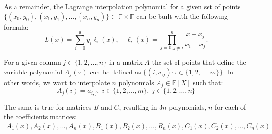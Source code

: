 \documentclass[../lecture-notes-148x210.tex]{subfiles}
\begin{document}
\begin{remark}
    As a remainder, the Lagrange interpolation polynomial for a given set of points 
    $\{(x_0,y_0),(x_1,y_1),\dots,(x_n,y_n)\} \subset \mathbb{F} \times \mathbb{F}$
    can be built with the following formula:
    \begin{equation*}
        L(x) = \sum_{i=0}^{n} y_i \ell_i(x), \quad \ell_i(x) = \prod_{j=0, j \neq i}^{n} \frac{x-x_j}{x_i-x_j}.
    \end{equation*}  
\end{remark}

For a given column $j \in \{1, 2, \dots, n\}$ in a matrix $A$ the set of points that define the
variable polynomial $A_j(x)$ can be defined as $\{(i, a_{ij}): i \in \{1, 2, \dots, m\}\}$. In other words,
we want to interpolate $n$ polynomials $A_j \in \mathbb{F}[X]$ such that:
\begin{equation*}
    A_j(i) = a_{i,j}, \; i \in \{1,2,\dots,m\}, \; j \in \{1,2,\dots,n\}
\end{equation*}

The same is true for matrices $B$ and $C$, resulting in $3n$ polynomials, $n$ for each of the
coefficients matrices:
\begin{align*}
    A_1(x), A_2(x), \dots, A_n(x), 
    B_1(x), B_2(x), \dots, B_n(x),
    C_1(x), C_2(x), \dots, C_n(x)
\end{align*}
\end{document}
